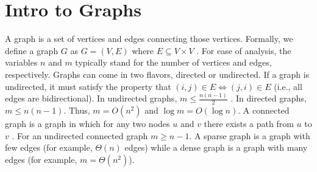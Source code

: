 \documentclass [12pt]{article}
\begin{document}
\section{Intro to Graphs} 
A graph is a set of vertices and edges connecting those vertices. Formally, we define a graph $G$ as $G = (V, E)$ where $E \subseteq V \times V$ . For ease of analysis, the variables $n$ and $m$ typically stand for the number of vertices and edges, respectively. Graphs can come in two flavors, directed or undirected. If a graph is undirected, it must satisfy the property that $(i, j) \in E \iff (j, i) \in E$ (i.e., all edges are bidirectional). In undirected graphs, $m \leq \frac{n(n-1)}{2}$ . In directed graphs, $m \leq n(n - 1)$. Thus, $m = O(n^2)$ and $\log m = O(\log n)$. A connected graph is a graph in which for any two nodes $u$ and $v$ there exists a path from $u$ to $v$ . For an undirected connected graph $m \geq n - 1$. A sparse graph is a graph with few edges (for example, $\Theta(n)$ edges) while a dense graph is a graph with many edges (for example, $m = \Theta(n^2)$).
\end{document}

